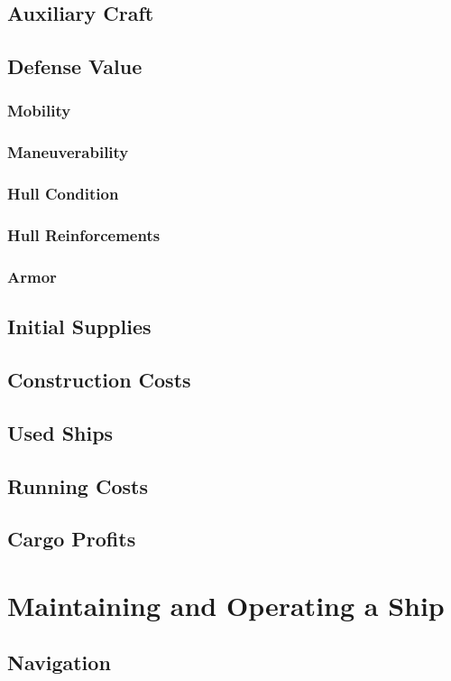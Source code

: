\begin{multicols*}{2}
\subsection{Auxiliary Craft}
\subsection{Defense Value}
\subsubsection{Mobility}
\subsubsection{Maneuverability}
\subsubsection{Hull Condition}
\subsubsection{Hull Reinforcements}
\subsubsection{Armor}
\subsection{Initial Supplies}
\subsection{Construction Costs}
\subsection{Used Ships}
\subsection{Running Costs}
\subsection{Cargo Profits}
\section{Maintaining and Operating a Ship}
\subsection{Navigation}

\end{multicols*}
